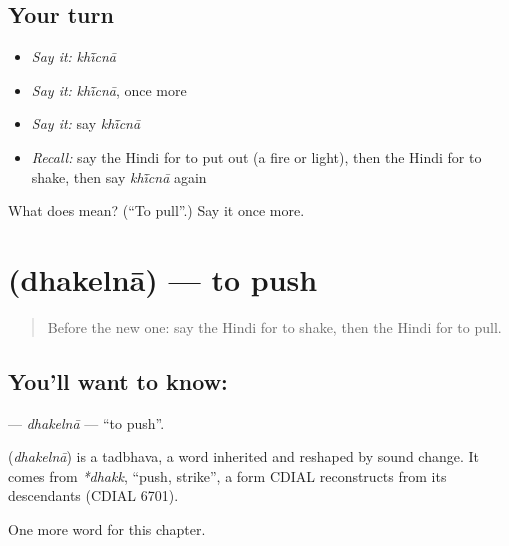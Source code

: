 \subsection*{Your turn}
\begin{itemize}
\raggedright
  \item \emph{Say it:} \emph{khī̃cnā}
  \item \emph{Say it:} \emph{khī̃cnā}, once more
  \item \emph{Say it:} say \emph{khī̃cnā}
  \item \emph{Recall:} say the Hindi for to put out (a fire or light), then the Hindi for to shake, then say \emph{khī̃cnā} again
\end{itemize}

\begin{tcolorbox}[breakable,colback=teal!4,colframe=teal!35!black,title={Before you move on}]
What does  mean? (\textquotedblleft{}To pull\textquotedblright{}.) Say it once more.
\end{tcolorbox}
\section[\texorpdfstring{\hi{धकेलना} (dhakelnā)}{धकेलना (dhakelnā)}]{ (dhakelnā) — to push}

\label{lesson:HI-C176-dhakelna}



\begin{quote}
Before the new one: say the Hindi for to shake, then the Hindi for to pull.
\end{quote}

\subsection*{You'll want to know: }
\textbf{} — \emph{dhakelnā} — \textquotedblleft{}to push\textquotedblright{}.

\begin{cousinweb}
\textbf{} (\emph{dhakelnā}) is a tadbhava, a word inherited and reshaped by sound change. It comes from \emph{*dhakk}, \textquotedblleft{}push, strike\textquotedblright{}, a form CDIAL reconstructs from its descendants (CDIAL 6701).
\end{cousinweb}

\begin{grammarlens}[title={What you've built}]
One more word for this chapter.
\end{grammarlens}

